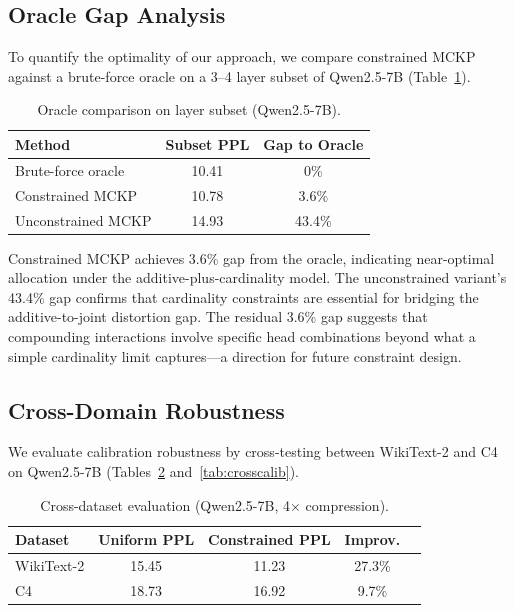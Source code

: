 \documentclass[11pt]{article}
\begin{document}
\subsection{Oracle Gap Analysis}
\label{sec:oracle}

To quantify the optimality of our approach, we compare constrained MCKP against a brute-force oracle on a 3--4 layer subset of Qwen2.5-7B (Table~\ref{tab:oracle}).

\begin{table}[h]
\centering
\caption{Oracle comparison on layer subset (Qwen2.5-7B).}
\label{tab:oracle}
\begin{tabular}{lcc}
\toprule
\textbf{Method} & \textbf{Subset PPL} & \textbf{Gap to Oracle} \\
\midrule
Brute-force oracle     & 10.41 & 0\% \\
Constrained MCKP       & 10.78 & 3.6\% \\
Unconstrained MCKP     & 14.93 & 43.4\% \\
\bottomrule
\end{tabular}
\end{table}

Constrained MCKP achieves 3.6\% gap from the oracle, indicating near-optimal allocation under the additive-plus-cardinality model.
The unconstrained variant's 43.4\% gap confirms that cardinality constraints are essential for bridging the additive-to-joint distortion gap.
The residual 3.6\% gap suggests that compounding interactions involve specific head combinations beyond what a simple cardinality limit captures---a direction for future constraint design.

\subsection{Cross-Domain Robustness}
\label{sec:robustness}

We evaluate calibration robustness by cross-testing between WikiText-2 and C4 on Qwen2.5-7B (Tables~\ref{tab:c4} and~\ref{tab:crosscalib}).

\begin{table}[h]
\centering
\caption{Cross-dataset evaluation (Qwen2.5-7B, 4$\times$ compression).}
\label{tab:c4}
\begin{tabular}{lcccc}
\toprule
\textbf{Dataset} & \textbf{Uniform PPL} & \textbf{Constrained PPL} & \textbf{Improv.} \\
\midrule
WikiText-2 & 15.45 & 11.23 & 27.3\% \\
C4         & 18.73 & 16.92 & 9.7\% \\
\bottomrule
\end{tabular}
\end{table}
\end{document}
